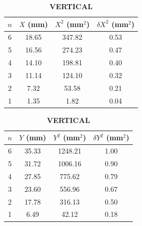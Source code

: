 \documentclass[a4paper,11pt]{article}
\begin{document}
\begin{table}[H]
  \centering
  \caption{5 kg — HORIZONTAL (left) and VERTICAL (right)}\label{tab:5kg-hv}
  \begin{subtable}[t]{0.47\linewidth}
    \centering
    \caption*{\textbf{HORIZONTAL}}\label{tab:5kg-h}
    \begin{tabular}{cccc}
      \toprule
      $n$ & $X$ (mm) & $X^2$ (mm$^2$) & $\delta X^2$ (mm$^2$)\\
      \midrule
       6 & 18.65 & 347.82 & 0.53\\
       5 & 16.56 & 274.23 & 0.47\\
       4 & 14.10 & 198.81 & 0.40\\
       3 & 11.14 & 124.10 & 0.32\\
       2 &  7.32 &  53.58 & 0.21\\
       1 &  1.35 &   1.82 & 0.04\\
      \bottomrule
    \end{tabular}
  \end{subtable}
  \hfill
  \begin{subtable}[t]{0.47\linewidth}
    \centering
    \caption*{\textbf{VERTICAL}}\label{tab:5kg-v}
    \begin{tabular}{cccc}
      \toprule
      $n$ & $Y$ (mm) & $Y^2$ (mm$^2$) & $\delta Y^2$ (mm$^2$)\\
      \midrule
       6 & 35.33 & 1248.21 & 1.00\\
       5 & 31.72 & 1006.16 & 0.90\\
       4 & 27.85 &  775.62 & 0.79\\
       3 & 23.60 &  556.96 & 0.67\\
       2 & 17.78 &  316.13 & 0.50\\
       1 &  6.49 &   42.12 & 0.18\\
      \bottomrule
    \end{tabular}
  \end{subtable}
\end{table}
\end{document}
